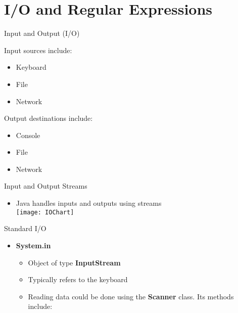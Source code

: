 %
%
%
\section{I/O and Regular Expressions}

\begin{itemize}
	\item Input and Output (I/O)
		\end{minipage}
		\begin{minipage}[t]{\widthof{Output destinations include:} + 1cm}
			\item Output destinations include:
			\begin{itemize}
				\item Console
				\item File
				\item Network
			\end{itemize}
		\end{minipage}
	\end{itemize}

	\item Input and Output Streams
	\begin{itemize}
		\item Java handles inputs and outputs using streams\\
		\texttt{[image: IOChart]}
	\end{itemize}

	\item Standard I/O
	\begin{itemize}
		\item \textbf{System.in}
		\begin{itemize}
			\item Object of type \textbf{InputStream}
			\item Typically refers to the keyboard
			\item Reading data could be done using the \textbf{Scanner} class. Its methods include:
		\end{itemize}


\end{itemize}
\end{itemize}
